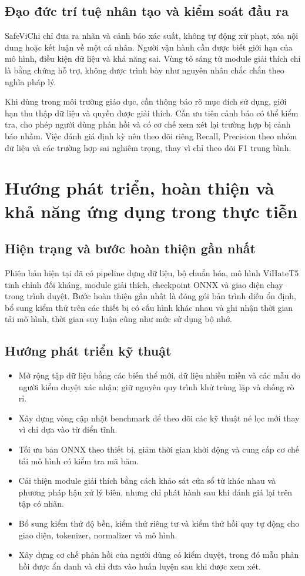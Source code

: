 \documentclass[12pt,a4paper]{article}
\begin{document}
\subsection{Đạo đức trí tuệ nhân tạo và kiểm soát đầu ra}
SafeViChi chỉ đưa ra nhãn và cảnh báo xác suất, không tự động xử phạt, xóa nội dung hoặc kết luận về một cá nhân. Người vận hành cần được biết giới hạn của mô hình, điều kiện dữ liệu và khả năng sai. Vùng tô sáng từ module giải thích chỉ là bằng chứng hỗ trợ, không được trình bày như nguyên nhân chắc chắn theo nghĩa pháp lý.

Khi dùng trong môi trường giáo dục, cần thông báo rõ mục đích sử dụng, giới hạn thu thập dữ liệu và quyền được giải thích. Cần ưu tiên cảnh báo có thể kiểm tra, cho phép người dùng phản hồi và có cơ chế xem xét lại trường hợp bị cảnh báo nhầm. Việc đánh giá định kỳ nên theo dõi riêng Recall, Precision theo nhóm dữ liệu và các trường hợp sai nghiêm trọng, thay vì chỉ theo dõi F1 trung bình.

\section{Hướng phát triển, hoàn thiện và khả năng ứng dụng trong thực tiễn}
\subsection{Hiện trạng và bước hoàn thiện gần nhất}
Phiên bản hiện tại đã có pipeline dựng dữ liệu, bộ chuẩn hóa, mô hình ViHateT5 tinh chỉnh đối kháng, module giải thích, checkpoint ONNX và giao diện chạy trong trình duyệt. Bước hoàn thiện gần nhất là đóng gói bản trình diễn ổn định, bổ sung kiểm thử trên các thiết bị có cấu hình khác nhau và ghi nhận thời gian tải mô hình, thời gian suy luận cũng như mức sử dụng bộ nhớ.

\subsection{Hướng phát triển kỹ thuật}
\begin{itemize}
  \item Mở rộng tập dữ liệu bằng các biến thể mới, dữ liệu nhiều miền và các mẫu do người kiểm duyệt xác nhận; giữ nguyên quy trình khử trùng lặp và chống rò rỉ.
  \item Xây dựng vòng cập nhật benchmark để theo dõi các kỹ thuật né lọc mới thay vì chỉ dựa vào từ điển tĩnh.
  \item Tối ưu bản ONNX theo thiết bị, giảm thời gian khởi động và cung cấp cơ chế tải mô hình có kiểm tra mã băm.
  \item Cải thiện module giải thích bằng cách khảo sát cửa sổ từ khác nhau và phương pháp hậu xử lý biên, nhưng chỉ phát hành sau khi đánh giá lại trên tập có nhãn.
  \item Bổ sung kiểm thử độ bền, kiểm thử riêng tư và kiểm thử hồi quy tự động cho giao diện, tokenizer, normalizer và mô hình.
  \item Xây dựng cơ chế phản hồi của người dùng có kiểm duyệt, trong đó mẫu phản hồi được ẩn danh và chỉ đưa vào huấn luyện sau khi được xem xét.
\end{itemize}
\end{document}
